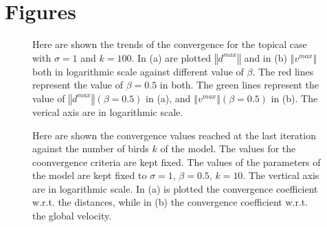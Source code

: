 \documentclass{article} %
\begin{document}
\section {Figures}
\begin{figure}[h!]
    \centering
    \caption{Here are shown the trends of the convergence for the topical case with $\sigma=1$ 
        and $k=100$. In (a) are plotted $\left\Vert d^{max}\right\Vert$ and in (b)
        $\left\Vert v^{max}\right\Vert$ both in logarithmic scale against
        different value of $\beta$. The red lines represent
        the value of $\beta=0.5$ in both. The green lines represent the value of 
        $\left\Vert d^{max}\right\Vert(\beta=0.5)$ in (a), and 
        $\left\Vert v^{max}\right\Vert(\beta=0.5)$ in (b).
        The verical axis are in logarithmic scale.}
    \label{fig1}
\end{figure}
\begin{figure}[hb]
    \centering
    \caption{Here are shown the convergence values reached at the last iteration against the 
        number of birds $k$ of the model. The values for the coonvergence criteria 
         are kept fixed. The values of the parameters of the model are 
        kept fixed to $\sigma=1$, $\beta=0.5$, $k=10$.
        The vertical axis are in logarithmic scale. In (a) is plotted the convergence coefficient w.r.t.
        the distances, while in (b) the convergence coefficient w.r.t. the global velocity.}
    \label{fig4}
\end{figure}
\end{document}
